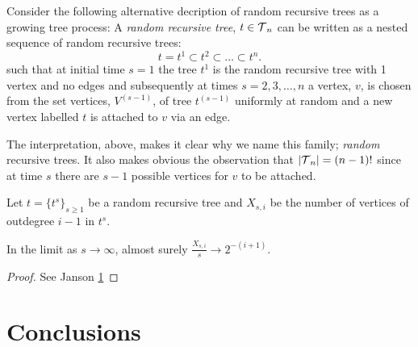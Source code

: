 Consider the following alternative decription of random recursive trees as a growing tree process:  A \emph{random recursive 
tree}, $ t \in \operatorname{\mathcal{T}}_n$ can be written as a nested sequence of random recursive trees:
\[t = t^1 \subset t^2 \subset \dots \subset t^n.\]
such that at initial time $s=1$ the tree $t^1$ is the random recursive tree with 1 vertex and no edges and subsequently at times 
$s = 2,3,\dots,n$ a vertex, $v$, is chosen from the set vertices, $V^{(s-1)}$, of tree $t^{(s-1)}$ uniformly at random and a 
new vertex labelled $t$ is attached to $v$ via an edge.  
\begin{remk}
 The interpretation, above, makes it clear why we name this family; \emph{random} recursive trees.  It also makes obvious the 
 observation that $\lvert \operatorname{\mathcal{T}}_n \rvert  = (n-1)!$ since at time $s$ there are $s-1$ possible vertices for $v$ to be attached.  
\end{remk}
Let $t = \{t^s\}_{s\geq 1}$ be a random recursive tree and $X_{s,i}$ be the number of vertices of outdegree $i-1$ in $t^s$.
 
\begin{thm}
 In the limit as $s \rightarrow \infty$, almost surely $\frac{X_{s,i}}{s} \rightarrow 2^{-(i+1)}$. 
\end{thm}
\begin{proof}
 See Janson \ref{}
\end{proof}
\section{Conclusions}

